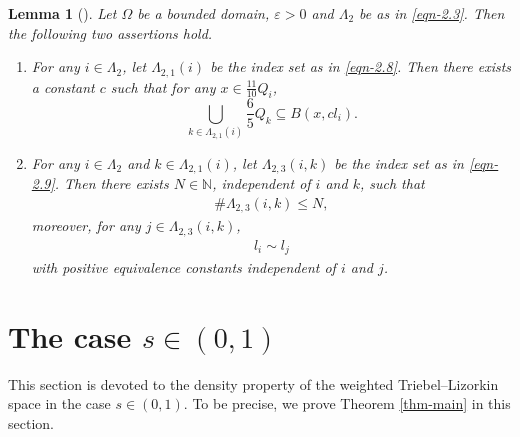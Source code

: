 \documentclass[11pt,twoside]{article}
\def\nn{{\mathbb N}}
\def\Qi{\frac{11}{10}Q_i}
\def\Qkk{\frac{6}{5}Q_k}
\def\blz{\Lambda}
\def\boz{{\Omega}}
\theoremstyle{mylem}
\newtheorem{lemma}[theorem]{Lemma}
\theoremstyle{definition}
\numberwithin{equation}{section}
\begin{document}
\begin{lemma}[\cite{cjlz2022}]\label{lem2.4}
Let \( \boz \) be a bounded domain, \( \varepsilon > 0 \) and \( \blz_2 \) be as in \eqref{eqn-2.3}. Then the following two assertions hold.
\begin{enumerate}
\item[\rm(i)] For any \( i \in \blz_2 \), let \( \blz_{2,1}(i) \) be the index set as in \eqref{eqn-2.8}. Then there exists a constant $c$ such that for any \( x \in \Qi \),
\[
\bigcup_{k \in \blz_{2,1}(i)} \Qkk \subseteq B(x, cl_i).
\]
\item[\rm(ii)]For any \( i \in \blz_2 \) and \( k \in \blz_{2,1}(i) \), let \( \blz_{2,3}(i,k) \) be the index set as in \eqref{eqn-2.9}.
Then there exists \( N \in \nn \), independent of \( i \) and \( k \), such that
\begin{align*}
\#\blz_{2,3}(i,k) \leq N,
\end{align*}
moreover, for any \( j \in \blz_{2,3}(i,k) \),
\begin{align*}
l_i \sim l_j 
\end{align*}
with positive equivalence constants independent of \( i \) and \( j \).
\end{enumerate}
\end{lemma}	




\section{The case $s\in(0,1)$}\label{s3}

This section is devoted to the density property of the weighted 
Triebel--Lizorkin space in the case $s\in (0,1)$. To be precise, 
we prove Theorem \ref{thm-main} in this section.
\end{document}
